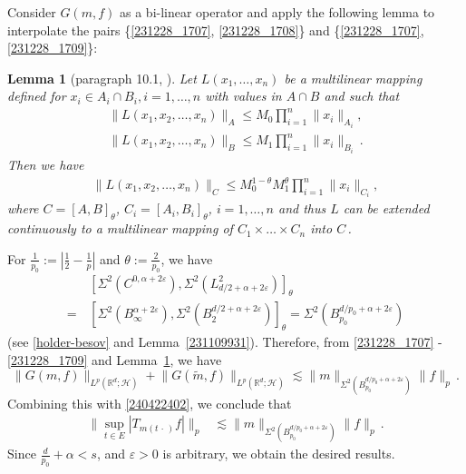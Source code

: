 \documentclass[11pt]{amsart}
\theoremstyle{plain}
\newtheorem{lemma}[theorem]{Lemma}
\theoremstyle{definition}
\theoremstyle{remark}
\numberwithin{equation}{section}
\newcommand{\cH}{\mathcal{H}}
\newcommand{\bR}{\mathbb{R}}
\begin{document}
Consider $G(m,f)$ as a bi-linear operator and apply the following lemma to interpolate the pairs 
\{\eqref{231228_1707}, \eqref{231228_1708}\} and \{\eqref{231228_1707}, \eqref{231228_1709}\}:
\begin{lemma}[paragraph 10.1, \cite{Cal1964}]\label{complex interpolation}
    Let $L(x_1, \dots, x_n)$ be a multilinear mapping defined for $x_i \in A_i \cap B_i, i=1,\dots, n$ with values in $A\cap B$ and such that
  \begin{align*}
    \big\| L(x_1, x_2, \dots, x_n) \big\|_A \leq M_0 \prod_{i=1}^n \| x_i \|_{A_i},\\
    \big\| L(x_1, x_2, \dots, x_n) \big\|_B \leq M_1 \prod_{i=1}^n \| x_i \|_{B_i}\,.
  \end{align*}
  Then we have
  \begin{align*}
    \big\| L(x_1,x_2, \dots, x_n) \big\|_C \leq M_0^{1-\theta}M_1^\theta  \prod_{i=1}^n \| x_i \|_{C_i},
  \end{align*}
  where $C=[A,B]_{\theta}$, $C_i = [A_i, B_i]_\theta$, $i=1,\dots,n$
and thus $L$ can be extended continuously to a multilinear mapping of $C_1\times \ldots\times C_n$ into $C$\,.
\end{lemma}

\noindent For $\frac{1}{p_0} := \left|\frac{1}{2}-\frac{1}{p}\right|$ and $\theta:=\frac{2}{p_0}$, we have  
\begin{align*}
    &\left[\Sigma^2\left(C^{0, \alpha+2\varepsilon}\right), \Sigma^2\left(L^2_{d/2+\alpha+2\varepsilon}\right)\right]_\theta
    \\
    =\,& \left[\Sigma^2\left(B^{\alpha+2\varepsilon}_{\infty}\right), \Sigma^2\left(B_2^{d/2+\alpha+2\varepsilon}\right)\right]_\theta=\Sigma^2\left( B_{p_0}^{d/p_0 + \alpha+2\varepsilon}\right)
\end{align*}
(see \eqref{holder-besov} and Lemma~\ref{231109931}).
Therefore, from \eqref{231228_1707} - \eqref{231228_1709} and Lemma~\ref{complex interpolation},  we have
$$
\big\|G(m,f)\big\|_{L^p(\bR^d;\cH)}+\big\|G(\widetilde{m},f)\big\|_{L^p(\bR^d;\cH)}\lesssim \|m\|_{\Sigma^2\left(B_{p_0}^{d/p_0+\alpha+2\varepsilon}\right)}\|f\|_p\,.
$$
Combining this with \eqref{240422402}, we conclude that 
\begin{align*}
\Big\|\sup_{t\in E}\left|T_{m(t\,\cdot\,)}f\right|\Big\|_p&\lesssim \|m\|_{\Sigma^2\left(B_{p_0}^{d/p_0+\alpha+2\varepsilon}\right)}\|f\|_p\,.
\end{align*}
Since $\frac{d}{p_0}+\alpha<s$, and $\varepsilon>0$ is arbitrary,
we obtain the desired results.
\end{document}
